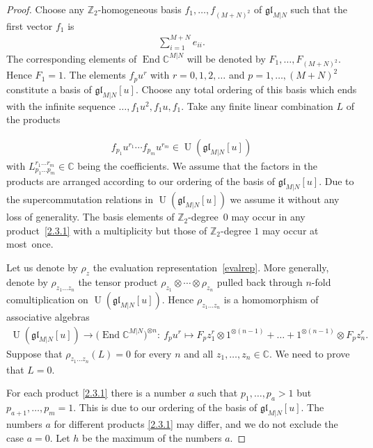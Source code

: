 \documentclass[11pt]{article}
\numberwithin{equation}{section}
\def\CC{{\mathbb{C}}}
\def\CMN{\CC^{M|N}}
\def\End{\operatorname{End}}
\def\g{\glMN [u]}
\def\glMN{\mathfrak{gl}_{M|N}}
\def\ot{\otimes}
\def\Ug{\operatorname{U}(\g)}
\def\ZZ{\mathbb{Z}}
\begin{document}
\begin{proof}
Choose any $\ZZ_2 $-homogeneous
basis $f_1,\dots, f_{(M+N)^2}$ of $\glMN$
such that the first vector $f_1$ is
\begin{gather}\label{esum}
\sum_{i=1}^{M+N}e_{ii} .
\end{gather}
The corresponding elements of $\End\CMN$
will be denoted by $F_1,\dots, F_{(M+N)^2} $.
Hence $F_1=1 $.
The elements $f_{p} u^{r}$
with $r=0 ,1 ,2 , \dots$
and $p=1 ,\dots, (M+N)^2$ constitute a basis of $\g $.
Choose any total ordering of this basis which ends with the
infinite sequence
$\dots , f_1 u^{2}, f_1 u , f_1$.
Take any finite linear combination $L$ of the products{\samepage
\begin{gather}\label{2.3.1}
f_{p_1}u^{r_1}\cdots f_{p_m}u^{r_m}\in\Ug
\end{gather}
with $L_{p_1\dots p_m}^{r_1\dots r_m}\in\CC$
being the coefficients.
We assume that the factors in the products are
arranged according to our ordering of the basis of $\g $.
Due to the supercommutation relations in $\Ug$
we assume it without any loss of generality.
The basis elements of $\ZZ_2 $-degree~$0$
may occur in any product~\eqref{2.3.1} with a multiplicity
but those of $\ZZ_2 $-degree $1$ may occur at most~once.

}

Let us denote by $\rho_z$ the evaluation representation~\eqref{evalrep}.
More generally, denote by $\rho_{z_1\dots z_n}$ the tensor product
$\rho_{z_1}\ot\cdots\ot\rho_{z_n}$
pulled back through $n $-fold comultiplication on $\Ug $.
Hence $\rho_{z_1\dots z_n}$ is a homomorphism of
associative algebras
\begin{gather*}
\Ug\to\big(\End\CMN\big)^{\ot n}\colon \
f_{p} u^{r}\mapsto
F_{p} z_1^{r}\ot1^{\ot (n-1)}+\dots+
1^{\ot (n-1)}\ot F_{p} z_n^{r} .
\end{gather*}
Suppose that $\rho_{z_1\dots z_n}(L)=0$ for every $n$
and all $z_1,\dots, z_n\in\CC $.
We need to prove that $L=0 $.

For each product \eqref{2.3.1} there is a number $a$ such that
$p_1,\dots, p_{a}>1$ but $p_{a+1} ,\dots, p_m=1 $.
This is due to our ordering of the basis of $\g $.
The numbers $a$ for different products
\eqref{2.3.1} may differ, and we do not exclude the case $a=0$.
Let $h$ be the maximum of the numbers $a $.


\end{proof}
\end{document}
